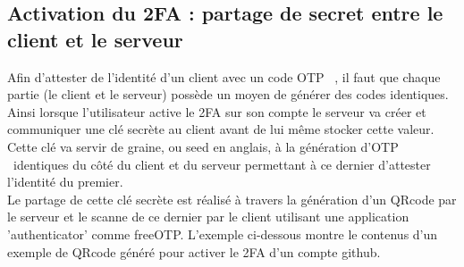 \documentclass[a4paper, 10pt]{article}
\newcommand{\otp}{\textsc{OTP} }
\begin{document}
        \subsection{Activation du 2FA : partage de secret entre le client et le serveur}

    Afin d'attester de l'identité d'un client avec un code \otp\ , il faut que chaque partie (le client et le serveur) possède \textcolor{myblue}{un moyen de générer des codes identiques}. 
Ainsi lorsque l'utilisateur active le 2FA sur son compte le serveur va créer et \textcolor{mygreen}{communiquer une clé secrète} au client avant de lui même \textcolor{myblue}{stocker} cette valeur.
Cette clé va servir de \textcolor{myblue}{graine}, ou seed en anglais, à la \textcolor{myblue}{génération d'\otp\ identiques} du côté du client et du serveur permettant à ce dernier d'attester l'identité du premier.\\

    Le \textcolor{myblue}{partage} de cette clé secrète est réalisé à travers la génération d'un \textcolor{mygreen}{QRcode} par le serveur et le scanne de ce dernier par le client utilisant une application 'authenticator' comme freeOTP. L'exemple ci-dessous montre le contenus d'un exemple de QRcode généré pour activer le 2FA d'un compte github.\\
\end{document}
